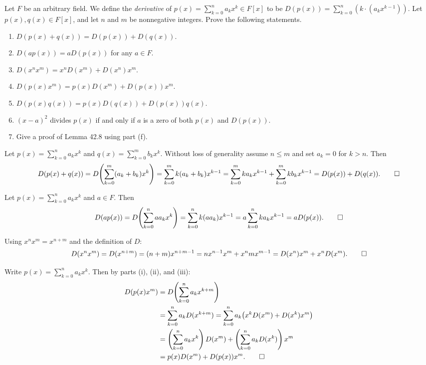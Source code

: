 \begin{problem}[42.15]
  Let $F$ be an arbitrary field. We define the \emph{derivative} of $p(x) = \sum_{k=0}^n a_kx^k \in F[x]$ to be $D(p(x)) = \sum_{k=0}^n \left(k \cdot \left(a_kx^{k-1}\right)\right)$. Let $p(x), q(x) \in F[x]$, and let $n$ and $m$ be nonnegative integers. Prove the following statements.
  \begin{enumerate}
    \item $D(p(x) + q(x)) = D(p(x)) + D(q(x))$.
    \item $D(ap(x)) = aD(p(x))$ for any $a \in F$.
    \item $D(x^nx^m) = x^nD(x^m) + D(x^n)x^m$.
    \item $D(p(x)x^m) = p(x)D(x^m) + D(p(x))x^m$.
    \item $D(p(x)q(x)) = p(x)D(q(x)) + D(p(x))q(x)$.
    \item $(x - a)^2$ divides $p(x)$ if and only if $a$ is a zero of both $p(x)$ and $D(p(x))$.
    \item Give a proof of Lemma 42.8 using part (f).
  \end{enumerate}
\end{problem}

\begin{solution}[(i)]
  Let $p(x) = \sum_{k=0}^n a_k x^k$ and $q(x) = \sum_{k=0}^m b_k x^k$. Without loss of generality assume $n \le m$ and set $a_k = 0$ for $k > n$. Then
  \[%
    D(p(x) + q(x)) = D\!\left(\sum_{k=0}^m (a_k + b_k)x^k\right) = \sum_{k=0}^m k(a_k + b_k)x^{k-1} = \sum_{k=0}^m ka_kx^{k-1} + \sum_{k=0}^m kb_kx^{k-1} = D(p(x)) + D(q(x))
  .\qedhere\]%
\end{solution}

\begin{solution}[(ii)]
  Let $p(x) = \sum_{k=0}^n a_k x^k$ and $a \in F$. Then
  \[%
    D(ap(x)) = D\!\left(\sum_{k=0}^n aa_k x^k\right) = \sum_{k=0}^n k(aa_k)x^{k-1} = a\sum_{k=0}^n ka_kx^{k-1} = aD(p(x))
  .\qedhere\]%
\end{solution}

\begin{solution}[(iii)]
  Using $x^n x^m = x^{n+m}$ and the definition of $D$:
  \[%
    D(x^nx^m) = D(x^{n+m}) = (n+m)x^{n+m-1} = nx^{n-1}x^m + x^n mx^{m-1} = D(x^n)x^m + x^nD(x^m)
  .\qedhere\]%
\end{solution}

\begin{solution}[(iv)]
  Write $p(x) = \sum_{k=0}^n a_k x^k$. Then by parts (i), (ii), and (iii):
  \begin{align*}
    D(p(x)x^m) &= D\!\left(\sum_{k=0}^n a_k x^{k+m}\right) \\
               &= \sum_{k=0}^n a_k D(x^{k+m}) = \sum_{k=0}^n a_k\!\left(x^k D(x^m) + D(x^k)x^m\right) \\
               &= \left(\sum_{k=0}^n a_k x^k\right)D(x^m) + \left(\sum_{k=0}^n a_k D(x^k)\right)x^m \\
               &= p(x)D(x^m) + D(p(x))x^m
  .\qedhere\end{align*}
\end{solution}

